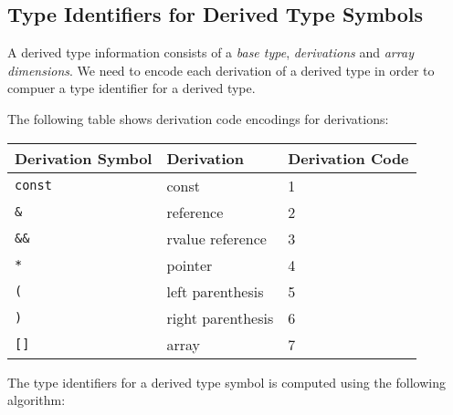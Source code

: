 \documentclass[a4paper,oneside,11pt]{book}
\theoremstyle{definition}
\begin{document}
\subsection{Type Identifiers for Derived Type Symbols}

A derived type information consists of a \emph{base type}, \emph{derivations} and \emph{array dimensions}.
We need to encode each derivation of a derived type in order to compuer a type identifier for a derived type.

The following table shows derivation code encodings for derivations:
\clearpage
\begin{flushleft}
\begin{supertabular}{lll}
\textbf{Derivation Symbol}& \textbf{Derivation}& \textbf{Derivation Code}\\
\hline
\verb|const|& const& 1\\
\verb|&|& reference& 2\\
\verb|&&|& rvalue reference& 3\\
\verb|*|& pointer& 4\\
\verb|(|& left parenthesis& 5\\
\verb|)|& right parenthesis& 6\\
\verb|[]|& array& 7\\
\hline
\end{supertabular}
\end{flushleft}

The type identifiers for a derived type symbol is computed using the following algorithm:
\end{document}
